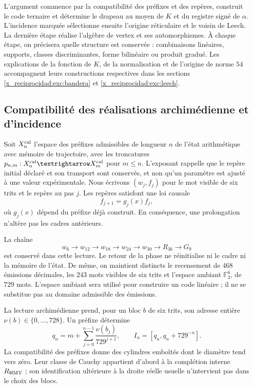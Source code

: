 L'argument commence par la compatibilité des préfixes et des repères,
construit le code ternaire et détermine le drapeau au moyen de \(K\) et du
registre signé de \(\alpha\). L'incidence marquée sélectionne ensuite
l'origine réticulaire et le voisin de Leech. La dernière étape réalise l'algèbre
de vertex et ses automorphismes. À chaque étape, on précisera quelle structure
est conservée : combinaisons linéaires, supports, classes discriminantes, forme
bilinéaire ou produit gradué. Les explications de la fonction de \(K\),
de la normalisation et de l'origine de norme \(54\) accompagnent leurs
constructions respectives dans les sections \ref{x_reciprocidad:exc:bandera} et \ref{x_reciprocidad:exc:leech}.





\subsection{Compatibilité des réalisations archimédienne et d'incidence}
\label{x_reciprocidad:exc:doble-lectura}

Soit $X_n^{\rm cal}$ l'espace des préfixes admissibles de longueur $n$ de l'état arithmétique avec mémoire de trajectoire, avec les troncatures $p_{n,m}:X_n^{\rm cal}\to X_m^{\rm cal}$ pour $m\leq n$. L'exposant rappelle que le repère initial déclaré et son transport sont conservés, et non qu'un paramètre est ajusté à une valeur expérimentale. Nous écrivons $(w_j,f_j)$ pour le mot visible de six trits et le repère au pas $j$. Les repères satisfont une loi causale
\[
 f_{j+1}=g_j(x)f_j,
\]
où $g_j(x)$ dépend du préfixe déjà construit. En conséquence, une
prolongation n'altère pas les cadres antérieurs.

La chaîne
\[
 w_6\longrightarrow w_{12}\longrightarrow w_{18}
 \longrightarrow w_{24}\longrightarrow w_{30}
 \longrightarrow R_{36}\longrightarrow G_9
\]
est conservé dans cette lecture. Le retour de la phase ne réinitialise ni le
cadre ni la mémoire de l'état. De même, on maintient distincts le
recensement de $468$ émissions décimales, les $243$ mots visibles de six
trits et l'espace ambiant $\mathbb F_3^6$, de $729$ mots. L'espace ambiant sera
utilisé pour construire un code linéaire ; il ne se substitue pas au domaine
admissible des émissions.

La lecture archimédienne prend, pour un bloc $b$ de six trits, son
adresse entière $\nu(b)\in\{0,\ldots,728\}$. Un préfixe détermine
\[
 q_n=m+\sum_{j=0}^{n-1}\frac{\nu(b_j)}{729^{j+1}},
 \qquad I_n=[q_n,q_n+729^{-n}].
\]
La compatibilité des préfixes donne des cylindres emboîtés dont le diamètre tend
vers zéro. Leur classe de Cauchy appartient d'abord à la complétion interne
$\mathbb R_{\rm HMT}$ ; son identification ultérieure à la droite réelle
usuelle n'intervient pas dans le choix des blocs.

